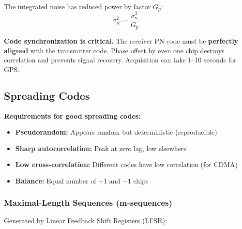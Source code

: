 The integrated noise has reduced power by factor $G_p$:
\begin{equation}
\sigma_{n'}^2 = \frac{\sigma_n^2}{G_p}
\end{equation}

\begin{warningbox}
\textbf{Code synchronization is critical.} The receiver PN code must be \textbf{perfectly aligned} with the transmitter code. Phase offset by even one chip destroys correlation and prevents signal recovery. Acquisition can take 1--10 seconds for GPS.
\end{warningbox}

\subsection{Spreading Codes}

\textbf{Requirements for good spreading codes:}
\begin{itemize}
\item \textbf{Pseudorandom:} Appears random but deterministic (reproducible)
\item \textbf{Sharp autocorrelation:} Peak at zero lag, low elsewhere
\item \textbf{Low cross-correlation:} Different codes have low correlation (for CDMA)
\item \textbf{Balance:} Equal number of +1 and $-1$ chips
\end{itemize}

\subsubsection{Maximal-Length Sequences (m-sequences)}

Generated by Linear Feedback Shift Registers (LFSR):

\begin{center}
\end{center}

